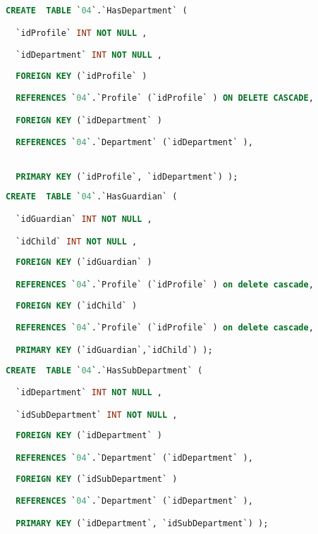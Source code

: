 \begin{Code}
\begin{lstlisting}[language=SQL,breaklines=true, label=createHasDepartment, caption=Create HasDepartment, ]
CREATE  TABLE `04`.`HasDepartment` (

  `idProfile` INT NOT NULL ,

  `idDepartment` INT NOT NULL ,
  
  FOREIGN KEY (`idProfile` )

  REFERENCES `04`.`Profile` (`idProfile` ) ON DELETE CASCADE,

  FOREIGN KEY (`idDepartment` )

  REFERENCES `04`.`Department` (`idDepartment` ),


  PRIMARY KEY (`idProfile`, `idDepartment`) );

\end{lstlisting}
\end{Code}

\begin{Code}
\begin{lstlisting}[language=SQL,breaklines=true, label=createHasGuardian, caption=Create HasGuardian, ]
CREATE  TABLE `04`.`HasGuardian` (

  `idGuardian` INT NOT NULL ,

  `idChild` INT NOT NULL ,
  
  FOREIGN KEY (`idGuardian` )

  REFERENCES `04`.`Profile` (`idProfile` ) on delete cascade,
  
  FOREIGN KEY (`idChild` )

  REFERENCES `04`.`Profile` (`idProfile` ) on delete cascade,

  PRIMARY KEY (`idGuardian`,`idChild`) );

\end{lstlisting}
\end{Code}

\begin{Code}
\begin{lstlisting}[language=SQL,breaklines=true, label=createHasSubDepartment, caption=Create HasSubDepartment, ]
CREATE  TABLE `04`.`HasSubDepartment` (

  `idDepartment` INT NOT NULL ,

  `idSubDepartment` INT NOT NULL ,
  
  FOREIGN KEY (`idDepartment` )

  REFERENCES `04`.`Department` (`idDepartment` ),
  
  FOREIGN KEY (`idSubDepartment` )

  REFERENCES `04`.`Department` (`idDepartment` ),

  PRIMARY KEY (`idDepartment`, `idSubDepartment`) );

\end{lstlisting}
\end{Code}

